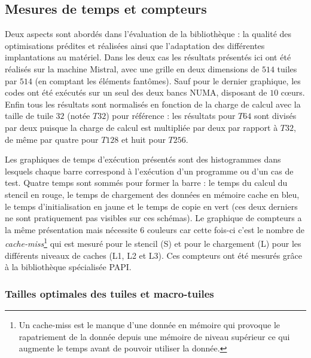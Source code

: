 \subsection{Mesures de temps et compteurs}

Deux aspects sont abordés dans l'évaluation de la bibliothèque : la qualité des optimisations prédites et réalisées ainsi que l'adaptation des différentes implantations au matériel. Dans les deux cas les résultats présentés ici ont été réalisés sur la machine \textsf{Mistral}, avec une grille en deux dimensions de $514$ tuiles par $514$ (en comptant les éléments fantômes). Sauf pour le dernier graphique, les codes ont été exécutés sur un seul des deux bancs NUMA, disposant de $10$ cœurs. Enfin tous les résultats sont normalisés en fonction de la charge de calcul avec la taille de tuile $32$ (notée $T32$) pour référence : les résultats pour $T64$ sont divisés par deux puisque la charge de calcul est multipliée par deux par rapport à $T32$, de même par quatre pour $T128$ et huit pour $T256$. 

Les graphiques de temps d'exécution présentés sont des histogrammes dans lesquels chaque barre correspond à l'exécution d'un programme ou d'un cas de test. Quatre temps sont sommés pour former la barre : le temps du calcul du stencil en rouge, le temps de chargement des données en mémoire cache en bleu, le temps d'initialisation en jaune et le temps de copie en vert (ces deux derniers ne sont pratiquement pas visibles sur ces schémas). Le graphique de compteurs a la même présentation mais nécessite $6$ couleurs car cette fois-ci c'est le nombre de \emph{cache-miss}\footnote{Un cache-miss est le manque d'une donnée en mémoire qui provoque le rapatriement de la donnée depuis une mémoire de niveau supérieur ce qui augmente le temps avant de pouvoir utiliser la donnée.} qui est mesuré pour le stencil (S) et pour le chargement (L) pour les différents niveaux de caches (L1, L2 et L3). Ces compteurs ont été mesurés grâce à la bibliothèque spécialisée \textsf{PAPI}.

\subsubsection*{Tailles optimales des tuiles et macro-tuiles}

